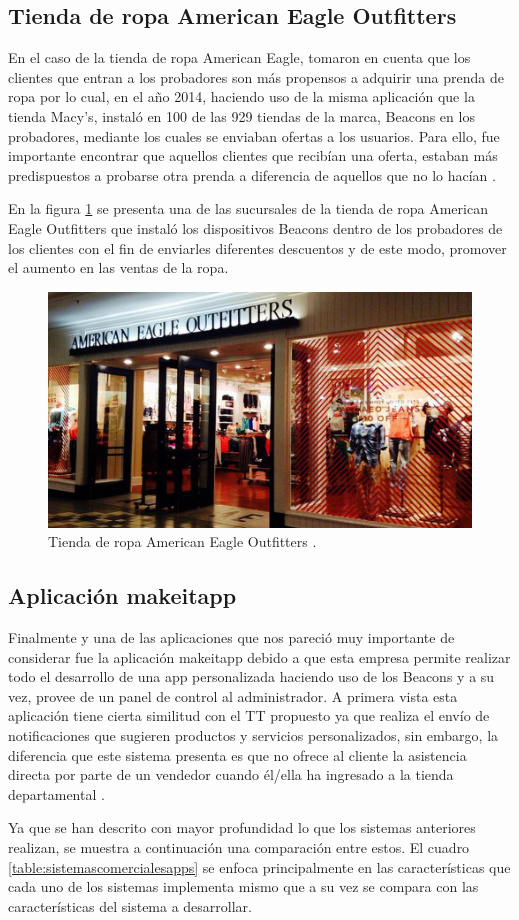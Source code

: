 \subsection{Tienda de ropa American Eagle Outfitters}
En el caso de la tienda de ropa American Eagle, tomaron en cuenta que los clientes que entran a los probadores son más propensos a adquirir una prenda de ropa por lo cual, en el año 2014, haciendo uso de la misma aplicación que la tienda Macy's, instaló en 100 de las 929 tiendas de la marca, Beacons en los probadores, mediante los cuales se enviaban ofertas a los usuarios. Para ello, fue importante encontrar que aquellos clientes que recibían una oferta, estaban más predispuestos a probarse otra prenda a diferencia de aquellos que no lo hacían \cite{AEO}.
\\ \par
En la figura \ref{image:americanEagle} se presenta una de las sucursales de la tienda de ropa American Eagle Outfitters que instaló los dispositivos Beacons dentro de los probadores de los clientes con el fin de enviarles diferentes descuentos y de este modo, promover el aumento en las ventas de la ropa.
\FloatBarrier
\begin{figure}[htbp!]
		\centering
			\includegraphics[width=.45 \textwidth]{imagenes/AEO}
		\caption{Tienda de ropa American Eagle Outfitters \cite{Forbes}.}
		\label{image:americanEagle}
\end{figure}
\FloatBarrier
\subsection{Aplicación makeitapp}
Finalmente y una de las aplicaciones que nos pareció muy importante de considerar fue la aplicación makeitapp debido a que esta empresa permite realizar todo el desarrollo de una app personalizada haciendo uso de los Beacons y a su vez, provee de un panel de control al administrador. A primera vista esta aplicación tiene cierta similitud con el TT propuesto ya que realiza el envío de notificaciones que sugieren productos y servicios personalizados, sin embargo, la diferencia que este sistema presenta es que no ofrece al cliente la asistencia directa por parte de un vendedor cuando él/ella ha ingresado a la tienda departamental \cite{makeitapp}.
\\ \par
Ya que se han descrito con mayor profundidad lo que los sistemas anteriores realizan, se muestra a continuación una comparación entre estos. El cuadro \ref{table:sistemascomercialesapps} se enfoca principalmente en las características que cada uno de los sistemas implementa mismo que a su vez se compara con las características del sistema a desarrollar.

